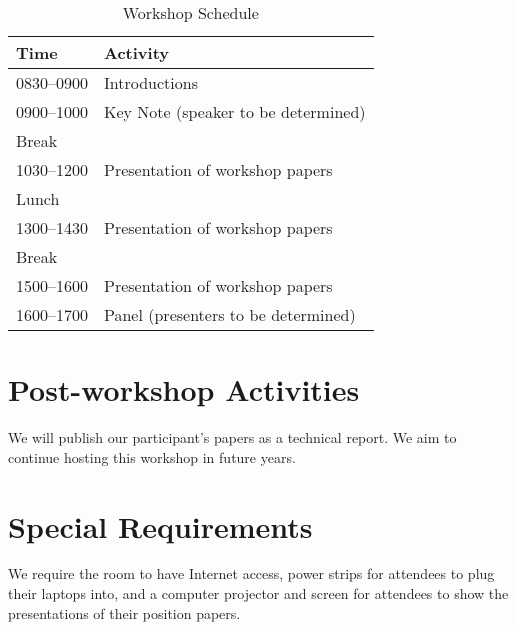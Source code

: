 \documentclass[authorpermission]{sigplanconf}
\begin{document}
\begin{table} [!htbp] %
\begin{tabularx}{\columnwidth}{l|X}
\textbf{Time}   & \textbf{Activity} \\
\hline
0830--0900    & Introductions \vspace{1mm} \\
0900--1000    & Key Note (speaker to be determined) \vspace{1mm} \\
Break              & ~\vspace{1mm}\\
1030--1200   & Presentation of workshop papers \vspace{1mm}\\
Lunch             & ~\vspace{1mm}\\
1300--1430   & Presentation of workshop papers \vspace{1mm}\\
Break              & ~\vspace{1mm}\\
1500--1600    & Presentation of workshop papers \vspace{1mm}\\
1600--1700    & Panel (presenters to be determined) \\

\end{tabularx}
\caption{Workshop Schedule}
\label{tab:schedule}
\end{table}

\section{Post-workshop Activities}

We will publish our participant's papers as a technical report.
We aim to continue hosting this workshop in future years.

\section{Special Requirements}

We require the room to have Internet access, power strips for
attendees to plug their laptops into, and a computer projector and
screen for attendees to show the presentations of their position
papers.
\end{document}
